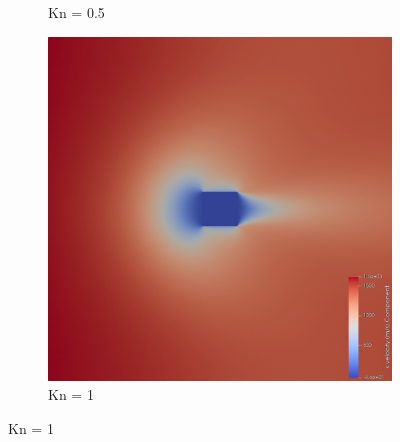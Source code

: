 \begin{figure}
\begin{subfigure}{0.32\textwidth}
        \caption{Kn = 0.5}
    \end{subfigure}
    \hfill
    \begin{subfigure}{0.32\textwidth}
        \centering
        \includegraphics[width=\textwidth]{Images/4. Results/Square Kn/pv/Kn1.png}
        \caption{Kn = 1}
    \end{subfigure}
    
    \vspace{5pt}
    

\end{figure}
